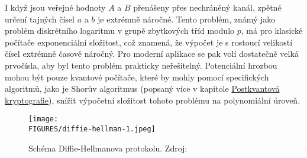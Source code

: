 I když jsou veřejné hodnoty \(A\) a \(B\) přenášeny přes nechráněný kanál, zpětné určení tajných čísel \(a\) a \(b\) je extrémně náročné. Tento problém, známý jako problém diskrétního logaritmu v grupě zbytkových tříd modulo \(p\), má pro klasické počítače exponenciální složitost, což znamená, že výpočet je s rostoucí velikostí čísel extrémně časově náročný. Pro moderní aplikace se pak volí dostatečně velká prvočísla, aby byl tento problém prakticky neřešitelný. Potenciální hrozbou mohou být pouze kvantové počítače, které by mohly pomocí specifických algoritmů, jako je Shorův algoritmus (popsaný více v kapitole \hyperref[sec:postkvantova-kryptografie]{Postkvantová kryptografie}), snížit výpočetní složitost tohoto problému na polynomiální úroveň.

\begin{figure}[htbp]
    \centering
    \texttt{[image: \\FIGURES/diffie-hellman-1.jpeg]}
    \caption{Schéma Diffie-Hellmanova protokolu. Zdroj: \parencite{diffie-hellman-1}}
    \label{fig:diffie-hellman}
  \end{figure}

\newpage